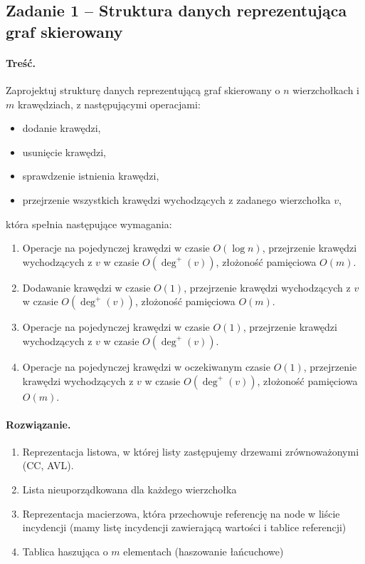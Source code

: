 \subsection{Zadanie 1 -- Struktura danych reprezentująca graf skierowany}

\paragraph{Treść.} Zaprojektuj strukturę danych reprezentującą graf skierowany o $n$ wierzchołkach i $m$ krawędziach, z
następującymi operacjami:
\begin{itemize}
	\item dodanie krawędzi,
	\item usunięcie krawędzi,
	\item sprawdzenie istnienia krawędzi,
	\item przejrzenie wszystkich krawędzi wychodzących z zadanego wierzchołka $v$,
\end{itemize}
która spełnia następujące wymagania:
\begin{enumerate}[label=\alph*)]
	\item Operacje na pojedynczej krawędzi w czasie $O(\log n)$, przejrzenie krawędzi wychodzących z $v$ w czasie $O(\deg^+(v))$, 
	złożoność pamięciowa $O(m)$.
	\item Dodawanie krawędzi w czasie $O(1)$, przejrzenie krawędzi wychodzących z $v$ w czasie $O(\deg^+(v))$, złożoność
	pamięciowa $O(m)$.
	\item Operacje na pojedynczej krawędzi w czasie $O(1)$, przejrzenie krawędzi wychodzących z $v$ w czasie $O(\deg^+(v))$.
	\item Operacje na pojedynczej krawędzi w oczekiwanym czasie $O(1)$, przejrzenie krawędzi wychodzących z $v$ w czasie
	$O(\deg^+(v))$, złożoność pamięciowa $O(m)$.
\end{enumerate}

\paragraph{Rozwiązanie.}
\begin{enumerate}[label=\alph*)]
	\item Reprezentacja listowa, w której 
	listy zastępujemy drzewami zrównoważonymi (CC, AVL).
	\item Lista nieuporządkowana dla każdego wierzchołka
	\item Reprezentacja macierzowa, która przechowuje
	referencję na node w liście incydencji (mamy listę incydencji zawierającą wartości i tablice referencji)
	\item Tablica haszująca o $m$ elementach (haszowanie łańcuchowe)
\end{enumerate}

